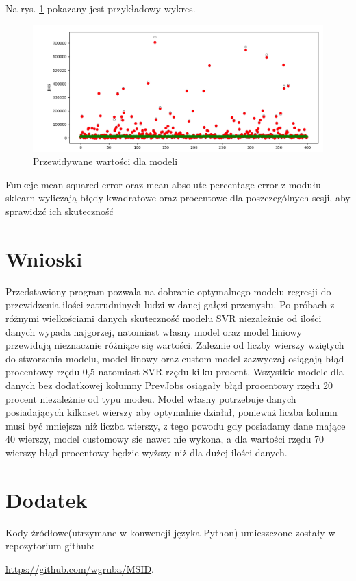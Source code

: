 \documentclass[10pt]{article}
\begin{document}
Na rys. \ref{fig:wykres} pokazany jest przykładowy wykres. 
\begin{figure}[!hbt]
\begin{center}
\includegraphics[width=0.8\linewidth]{rys1.png}
\caption{Przewidywane wartości dla modeli}
\label{fig:wykres}
\end{center}
\end{figure}

Funkcje mean squared error oraz mean absolute percentage error z modułu sklearn wyliczają błędy kwadratowe oraz procentowe dla poszczególnych sesji, aby sprawidzć ich skuteczność

\section{Wnioski}
Przedstawiony program pozwala na dobranie optymalnego modelu regresji do przewidzenia ilości zatrudninych ludzi w danej gałęzi przemysłu. Po próbach z różnymi wielkościami danych skuteczność modelu SVR niezależnie od ilości danych wypada najgorzej, natomiast własny model oraz model liniowy przewidują nieznacznie różniące się wartości.
Zależnie od liczby wierszy wziętych do stworzenia modelu, model linowy oraz custom model zazwyczaj osiągają błąd procentowy rzędu 0,5 natomiast SVR rzędu kilku procent.
Wszystkie modele dla danych bez dodatkowej kolumny PrevJobs osiągały błąd procentowy rzędu 20 procent niezależnie od typu modeu.
Model własny potrzebuje danych posiadających kilkaset wierszy aby optymalnie działał, ponieważ liczba kolumn musi być mniejsza niż liczba wierszy, z tego powodu gdy posiadamy dane mające 40 wierszy, model customowy sie nawet nie wykona, a dla wartości rzędu 70 wierszy błąd procentowy będzie wyższy niż dla dużej ilości danych. 

    

\appendix
\section{Dodatek}
Kody źródłowe(utrzymane w konwencji języka Python) umieszczone zostały w repozytorium github:

\noindent \url{https://github.com/wgruba/MSID}.
\end{document}
